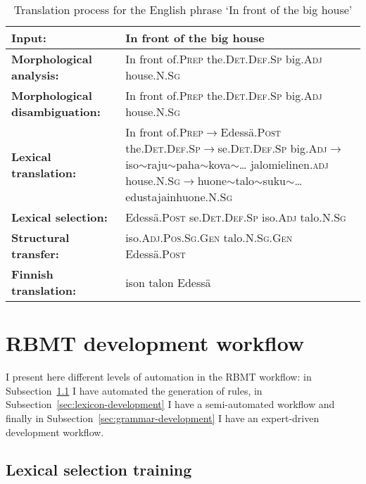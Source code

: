 \documentclass[free]{flammie}
\begin{document}
\begin{table*}
\begin{center}
    \begin{tabular}{lp{}}
\toprule
\bf Input: & In front of the big house \\
\midrule
\bf Morphological analysis: & In front of.\textsc{Prep} the.\textsc{Det.Def.Sp}
big.\textsc{Adj} house.\textsc{N.Sg}
\\
\midrule
\bf Morphological disambiguation: &
In front of.\textsc{Prep} the.\textsc{Det.Def.Sp}
big.\textsc{Adj} house.\textsc{N.Sg}
\\
\midrule
\bf Lexical translation: &
In front of.\textsc{Prep}$\rightarrow$Edess\"a.\textsc{Post}
the.\textsc{Det.Def.Sp}$\rightarrow$se.\textsc{Det.Def.Sp}
big.\textsc{Adj}$\rightarrow$iso$\sim$raju$\sim$paha$\sim$kova$\sim$\ldots
jalomielinen.\textsc{adj}
house.\textsc{N.Sg}$\rightarrow$huone$\sim$talo$\sim$suku$\sim$\ldots
edustajainhuone.\textsc{N.Sg}
\\
\midrule
\bf Lexical selection: & Edess\"a.\textsc{Post}  se.\textsc{Det.Def.Sp} iso.\textsc{Adj} talo.\textsc{N.Sg}
\\
\midrule
\bf Structural transfer: & iso.\textsc{Adj.Pos.Sg.Gen} talo.\textsc{N.Sg.Gen}
Edess\"a.\textsc{Post}
\\
\midrule
\bf Finnish translation: & ison talon Edess\"a \\
\bottomrule
\end{tabular}
\caption{Translation process for the English phrase `In front of the big house'
\label{table:translation}
    }
\end{center}
\end{table*}

\section{RBMT development workflow}
\label{sec:training}

I present here different levels of automation in the RBMT workflow: in
Subsection~\ref{sec:lexical-selection} I have automated the generation of
rules, in Subsection~\ref{sec:lexicon-development} I have a semi-automated
workflow and finally in Subsection~\ref{sec:grammar-development} I have
an expert-driven development workflow.

\subsection{Lexical selection training}
\label{sec:lexical-selection}
\end{document}
